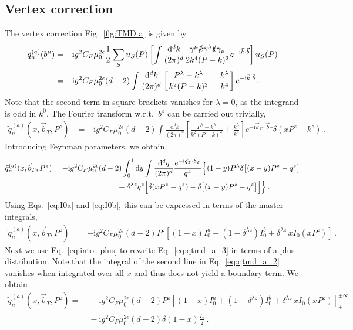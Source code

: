 \documentclass[11pt,a4paper]{article}
\DeclareRobustCommand{\eq}[1]{Eq.~\eqref{eq:#1}}
\DeclareRobustCommand{\eqs}[2]{Eqs.~\eqref{eq:#1} and \eqref{eq:#2}}
\DeclareRobustCommand{\fig}[1]{Fig.~\ref{fig:#1}}
\newcommand{\df}{\mathrm{d}}
\newcommand{\img}{\mathrm{i}}
\newcommand{\eps}{\epsilon}
\newcommand{\nn}{\nonumber}
\newcommand{\bt}{\vec b_T}
\newcommand{\kt}{\vec k_T}
\newcommand{\qt}{\vec q_T}
\newcommand{\plusinf}{_+^{\pm\infty}}
\begin{document}
\subsection{Vertex correction}
The vertex correction \fig{TMD a} is given by
\begin{align} \label{eq:qtmd_a_1}
 \tilde q^{(a)}_n(b^\mu) &
 = -\img g^2 C_F \mu_0^{2\eps} \frac{1}{2} \sum_S
  \bar u_S(P) \left[\int\frac{\df^dk}{(2\pi)^d}
  \frac{\gamma^\mu \slashed{k} \gamma^\lambda \slashed{k} \gamma_\mu}{2 k^4 (P-k)^2}
  e^{-\img \vec k \cdot \vec b} \right] u_S(P)
\nn\\&
 = -\img g^2 C_F \mu_0^{2\eps} (d-2) \int\frac{\df^dk}{(2\pi)^d}
   \left[ \frac{P^\lambda - k^\lambda}{k^2 (P-k)^2} + \frac{k^\lambda}{k^4} \right]
  e^{-\img \vec k \cdot \vec b}
\,.\end{align}
Note that the second term in square brackets vanishes for $\lambda = 0$, as the integrand is odd in $k^0$.
The Fourier transform w.r.t.\ $b^z$ can be carried out trivially,
\begin{align}
 \tilde q^{(a)}_n(x, \bt, P^z) &
 = -\img g^2 C_F \mu_0^{2\eps} (d-2) \int\frac{\df^dk}{(2\pi)^d}
  \left[ \frac{P^\lambda - k^\lambda}{k^2 (P-k)^2} + \frac{k^\lambda}{k^4} \right]
  e^{-\img \kt \cdot \bt} \delta(x P^z - k^z)
\,.\end{align}
Introducing Feynman parameters, we obtain
\begin{align} \label{eq:qtmd_a_2}
 \tilde q^{(a)}_n(x, \bt, P^z) &
 = -\img g^2 C_F \mu_0^{2\eps} (d-2) \int_0^1 \df y
  \int\frac{\df^d q}{(2\pi)^d} \frac{e^{-\img \qt \cdot \bt}}{q^4}
  \Bigl\{ (1-y) P^\lambda \delta\bigl[(x-y)P^z - q^z\bigr]
  \nn\\*&\hspace{3cm}
  + \delta^{\lambda z} q^z \Bigr[ \delta(x P^z - q^z) - \delta\bigl[(x-y)P^z - q^z\bigr] \Bigr]
  \Bigr\}
\,.\end{align}
Using \eqs{I0a}{I0b}, this can be expressed in terms of the master integrals,
\begin{align} \label{eq:qtmd_a_3}
 \tilde q^{(a)}_n(x, \bt, P^z) &
 = -\img g^2 C_F \mu_0^{2\eps} (d-2) P^z
  \left[ (1-x) I_0^a + (1 - \delta^{\lambda z}) I_0^b
  + \delta^{\lambda z} \, x I_0(x P^z) \right]
\,.\end{align}
Next we use \eq{into_plus} to rewrite \eq{qtmd_a_3} in terms of a plus distribution.
Note that the integral of the second line in \eq{qtmd_a_2} vanishes when integrated over all $x$
and thus does not yield a boundary term. We obtain
\begin{align} \label{eq:qtmd_a_4}
 \tilde q^{(a)}_n(x, \bt, P^z)
 =&~ -\img g^2 C_F \mu_0^{2\eps} (d-2) P^z
  \left[ (1-x) I_0^a + (1 - \delta^{\lambda z}) I_0^b
  + \delta^{\lambda z} \, x I_0(x P^z) \right]\plusinf
 \nn\\&~
 -\img g^2 C_F \mu_0^{2\eps} (d-2) \delta(1-x) \frac{I_2}{2}
\,.\end{align}
\end{document}
